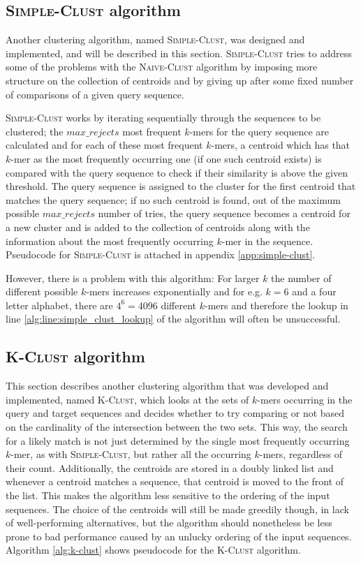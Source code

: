 \subsection{\textsc{Simple-Clust} algorithm}

Another clustering algorithm, named \textsc{Simple-Clust}, was designed and
implemented, and will be described in this section. \textsc{Simple-Clust} tries
to address some of the problems with the \textsc{Naive-Clust} algorithm by
imposing more structure on the collection of centroids and by giving up after
some fixed number of comparisons of a given query sequence.

\textsc{Simple-Clust} works by iterating sequentially through the sequences to
be clustered; the $max\_rejects$ most frequent $k$-mers for the query sequence
are calculated and for each of these most frequent $k$-mers, a centroid which
has that $k$-mer as the most frequently occurring one (if one such centroid
exists) is compared with the query sequence to check if their similarity is
above the given threshold. The query sequence is assigned to the cluster for
the first centroid that matches the query sequence; if no such centroid is
found, out of the maximum possible $max\_rejects$ number of tries, the query
sequence becomes a centroid for a new cluster and is added to the collection of
centroids along with the information about the most frequently occurring
$k$-mer in the sequence. Pseudocode for \textsc{Simple-Clust} is attached in
appendix \ref{app:simple-clust}.

However, there is a problem with this algorithm: For larger $k$ the number of
different possible $k$-mers increases exponentially and for e.g. $k = 6$ and a
four letter alphabet, there are $4^6 = 4096$ different $k$-mers and therefore
the lookup in line \ref{alg:line:simple_clust_lookup} of the algorithm will
often be unsuccessful.


\subsection{\textsc{K-Clust} algorithm}
\label{sec:k-clust_algorithm}

This section describes another clustering algorithm that was developed and
implemented, named \textsc{K-Clust}, which looks at the sets of $k$-mers
occurring in the query and target sequences and decides whether to try
comparing or not based on the cardinality of the intersection between the two
sets. This way, the search for a likely match is not just determined by the
single most frequently occurring $k$-mer, as with \textsc{Simple-Clust}, but
rather all the occurring $k$-mers, regardless of their count. Additionally, the
centroids are stored in a doubly linked list and whenever a centroid matches a
sequence, that centroid is moved to the front of the list. This makes the
algorithm less sensitive to the ordering of the input sequences. The choice of
the centroids will still be made greedily though, in lack of well-performing
alternatives, but the algorithm should nonetheless be less prone to bad
performance caused by an unlucky ordering of the input sequences. Algorithm
\ref{alg:k-clust} shows pseudocode for the \textsc{K-Clust} algorithm.

